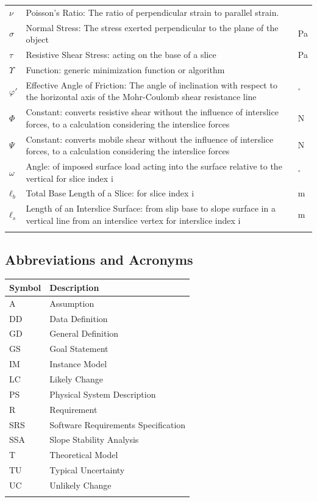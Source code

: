 \documentclass[12pt]{article}
\begin{document}
\begin{longtabu}{l X[l] l}
\\
$ν$ & Poisson's Ratio: The ratio of perpendicular strain to parallel strain. & 
\\
$σ$ & Normal Stress: The stress exerted perpendicular to the plane of the object & Pa
\\
$τ$ & Resistive Shear Stress: acting on the base of a slice & Pa
\\
$Υ$ & Function: generic minimization function or algorithm & 
\\
$φ'$ & Effective Angle of Friction: The angle of inclination with respect to the horizontal axis of the Mohr-Coulomb shear resistance line & ${}^{\circ}$
\\
$Φ$ & Constant: converts resistive shear without the influence of interslice forces, to a calculation considering the interslice forces & N
\\
$Ψ$ & Constant: converts mobile shear without the influence of interslice forces, to a calculation considering the interslice forces & N
\\
$ω$ & Angle: of imposed surface load acting into the surface relative to the vertical for slice index i & ${}^{\circ}$
\\
${ℓ_{b}}$ & Total Base Length of a Slice: for slice index i & m
\\
${ℓ_{s}}$ & Length of an Interslice Surface: from slip base to slope surface in a vertical line from an interslice vertex for interslice index i & m
\\
\bottomrule
\label{Table:ToS}
\end{longtabu}
\subsection{Abbreviations and Acronyms}
\label{Sec:TAbbAcc}
\begin{longtable*}{l l}
\toprule
Symbol & Description
\\
\midrule
A & Assumption
\\
DD & Data Definition
\\
GD & General Definition
\\
GS & Goal Statement
\\
IM & Instance Model
\\
LC & Likely Change
\\
PS & Physical System Description
\\
R & Requirement
\\
SRS & Software Requirements Specification
\\
SSA & Slope Stability Analysis
\\
T & Theoretical Model
\\
TU & Typical Uncertainty
\\
UC & Unlikely Change
\\
\bottomrule
\label{Table:TAbbAcc}
\end{longtable*}
\end{document}

